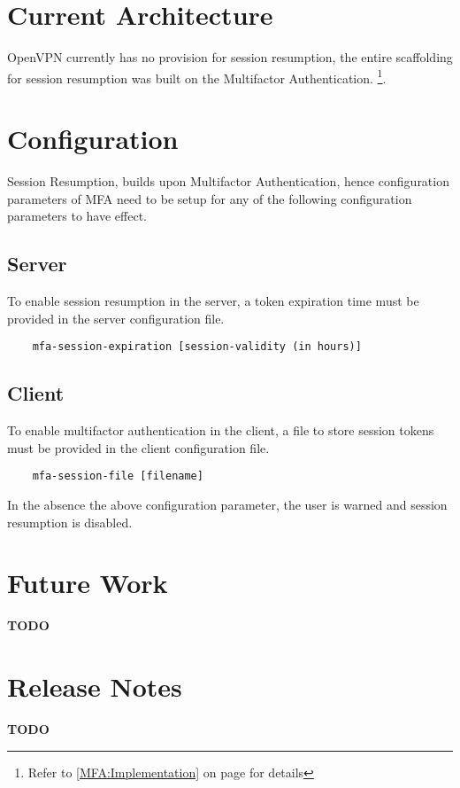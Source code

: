 \documentclass[11pt,oneside]{book}
\begin{document}
\section{Current Architecture}
OpenVPN currently has no provision for session resumption, the entire scaffolding for session
resumption was built on the Multifactor Authentication. \footnote{ Refer to \ref{MFA:Implementation}
on page \pageref{MFA:Implementation} for details}.

\section{Configuration}
Session Resumption, builds upon Multifactor Authentication, hence configuration parameters of MFA
need to be setup for any of the following configuration parameters to have effect.

\subsection{Server}
To enable session resumption in the server, a token expiration time must be provided in the server
configuration file.

\begin{verbatim}
    mfa-session-expiration [session-validity (in hours)]
\end{verbatim}

\subsection{Client}
To enable multifactor authentication in the client, a file to store session tokens must be provided
in the client configuration file.

\begin{verbatim}
    mfa-session-file [filename]
\end{verbatim}

\noindent
In the absence the above configuration parameter, the user is warned and session resumption is
disabled.

\section{Future Work}
\textbf{TODO}

\section{Release Notes}
\textbf{TODO}
\end{document}
